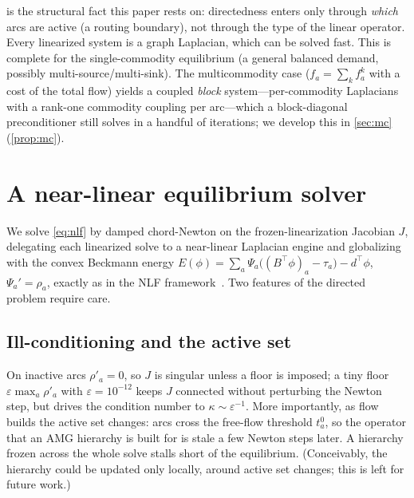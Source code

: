 \documentclass[ijoc]{informs3}
\begin{document}
 is the structural fact this paper rests on: directedness enters only through \emph{which}
arcs are active (a routing boundary), not through the type of the linear operator. Every linearized system is a
graph Laplacian, which can be solved fast. This is complete for the single-commodity
equilibrium (a general balanced demand, possibly multi-source/multi-sink). The multicommodity case
($f_a=\sum_k f_a^k$ with a cost of the total flow) yields a coupled \emph{block} system---per-commodity
Laplacians with a rank-one commodity coupling per arc---which a block-diagonal preconditioner still
solves in a handful of iterations; we develop this in \cref{sec:mc} (\cref{prop:mc}).

\section{A near-linear equilibrium solver}\label{sec:solver}
We solve \cref{eq:nlf} by damped chord-Newton on the frozen-linearization Jacobian $J$, delegating each
linearized solve to a near-linear Laplacian engine and globalizing with the convex Beckmann energy
$E(\phi)=\sum_a\Psi_a\big((B^\top\phi)_a-\tau_a\big)-d^\top\phi$, $\Psi_a'=\rho_a$, exactly as in the NLF
framework~\citep{nlf}. Two features of the directed problem require care.

\subsection{Ill-conditioning and the active set}
On inactive arcs $\rho'_a=0$, so $J$ is singular unless a floor is imposed; a tiny floor $\varepsilon\max_a\rho'_a$
with $\varepsilon=10^{-12}$ keeps $J$ connected without perturbing the Newton step, but drives the condition number
to $\kappa\sim\varepsilon^{-1}$. More importantly, as flow builds the active set changes: arcs cross the
free-flow threshold $t^0_a$, so the operator that an AMG hierarchy is built for is stale a few Newton
steps later. A hierarchy frozen across the whole solve stalls short of the equilibrium. (Conceivably, the hierarchy could be updated only locally, around active set changes; this is left for future work.)
\end{document}
